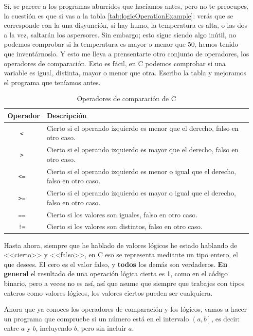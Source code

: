 \documentclass[a4paper]{article}
\begin{document}
Sí, se parece a los programas aburridos que hacíamos antes, pero no te
preocupes, la cuestión es que si vas a la tabla
\ref{tab:logicOperationExample}:  verás
que se corresponde con la una disyunción, si hay humo, la temperatura es alta,
o las dos a la vez, saltarán los aspersores. Sin embargo; esto sigue siendo
algo inútil,
no podemos comprobar si la temperatura es mayor o menor que 50, hemos tenido que
inventárnoslo. Y esto me lleva a prensentarte otro conjunto de operadores, los
operadores de comparación. Esto es fácil, en C podemos comprobar si una
variable es igual, distinta, mayor o menor que otra. Escribo la tabla y
mejoramos el programa que teníamos antes.
\begin{table}[H]
\centering
\begin{tabularx}{\linewidth}{|c|Y|}
\hline
\bf Operador & \bf Descripción \\ \hline
\tt < &   Cierto si el operando izquierdo es menor que el derecho, falso en otro caso.\\\hline
\tt > &   Cierto si el operando izquierdo es mayor que el derecho, falso en otro caso.\\\hline
\tt <= &  Cierto si el operando izquierdo es menor o igual que el derecho, falso en otro caso. \\\hline
\tt >= &  Cierto si el operando izquierdo es mayor o igual que el derecho, falso en otro caso. \\\hline
\tt == &  Cierto si los valores son iguales, falso en otro caso.\\\hline
\tt != &  Cierto si los valores son distintos, falso en otro caso. \\\hline
\end{tabularx}
\caption{Operadores de comparación de C}
\label{tab:logicOperators}
\end{table}

Hasta ahora, siempre que he hablado de valores lógicos he estado hablando de
<<cierto>> y <<falso>>, en C eso se representa mediante un tipo entero, el que
desees. El cero es el valor falso, y \textbf{todos} los demás son verdaderos.
\textbf{En general} el resultado de una operación lógica cierta es 1, como en
el código binario, pero a veces no es así, así que asume que siempre que
trabajes con tipos enteros como valores lógicos, los valores ciertos pueden ser
cualquiera.

Ahora que ya conoces los operadores de comparación y los lógicos, vamos a hacer
un programa que compruebe si un número está en el intervalo $\left(a, b\right]$,
es decir: entre $a$ y $b$, incluyendo $b$, pero sin incluir $a$.
\end{document}
